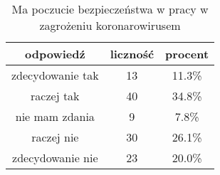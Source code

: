 \begin{table}[H]
\caption{Ma poczucie bezpieczeństwa w pracy w zagrożeniu koronarowirusem}
\centering
\begin{tabular}{ | c | c | c |}
\hline
odpowiedź & liczność & procent\\
\hline
zdecydowanie tak  &  13  & 11.3\% \\
\hline
raczej tak  &  40  & 34.8\% \\
\hline
nie mam zdania  &  9  & 7.8\% \\
\hline
raczej nie  &  30  & 26.1\% \\
\hline
zdecydowanie nie  &  23  & 20.0\% \\
\hline
\end{tabular}
\label{tab:Q18}
\end{table}
